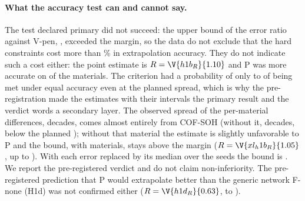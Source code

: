 \documentclass[journal=jcisd8,manuscript=article]{achemso}
\begin{document}
\paragraph{What the accuracy test can and cannot say.} The test declared primary did not succeed: the upper bound of
the error ratio against V-pen, , exceeded the  margin, so the data do not exclude
that the hard constraints cost more than \% in extrapolation accuracy. They do not indicate such a
cost either: the point estimate is $R = \V{h1b_R}{1.10}$ and P was more accurate on  of the
 materials. The criterion had a probability of only  to  of being
met under equal accuracy even at the planned spread, which is why the pre-registration made the estimates with their
intervals the primary result and the verdict words a secondary layer. The observed spread of the per-material differences,  decades, comes almost
entirely from COF-SOH (without it,  decades, below the planned
); without that material the estimate is slightly unfavorable to P and the bound, with
 materials, stays above the margin ($R = \V{xl_h1b_R}{1.05}$, up to ). With
each error replaced by its median over the seeds the bound is . We report the pre-registered verdict and do not claim
non-inferiority. The pre-registered prediction that P would extrapolate better than the generic network F-none (H1d)
was not confirmed either ($R = \V{h1d_R}{0.63}$,  to ).
\end{document}
